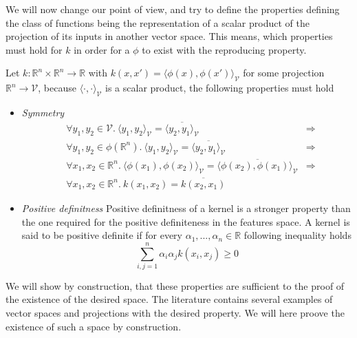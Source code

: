 We will now change our point of view, and try to define the properties defining the class of functions being the representation of a scalar product of the projection of its inputs in another vector space. This means, which properties must hold for $k$ in order for a $\phi$ to exist with the reproducing property.

Let $k :\mathbb{R}^n \times \mathbb{R}^n \rightarrow \mathbb{R}$ with $k(x, x') = \langle \phi(x), \phi(x')\rangle _{\mathcal{V}}$ for some projection $\mathbb{R}^n \rightarrow \mathcal{V}$, because $\langle \cdot, \cdot\rangle _{\mathcal{V}}$ is a scalar product, the following properties must hold

\begin{itemize}
\item \textit{Symmetry}
  \begin{equation*}
    \begin{aligned}
      & \forall y_1, y_2 \in \mathcal{V}.\ 
      \langle y_1, y_2\rangle _{\mathcal{V}} = \overline{\langle y_2, y_1\rangle _{\mathcal{V}}} & \Rightarrow\\
      & \forall y_1, y_2 \in \phi(\mathbb{R}^n).\ 
      \langle y_1, y_2\rangle _{\mathcal{V}} = \overline{\langle y_2, y_1\rangle _{\mathcal{V}}} & \Rightarrow\\
      &\forall x_1, x_2 \in \mathbb{R}^n.\ 
      \langle \phi(x_1), \phi(x_2)\rangle _{\mathcal{V}} = \overline{\langle \phi(x_2), \phi(x_1)\rangle _{\mathcal{V}}} &\Rightarrow\\
      &\forall x_1, x_2 \in \mathbb{R}^n.\ 
         k\left(x_1, x_2\right) = \overline{k\left(x_2, x_1\right)}
    \end{aligned}
  \end{equation*}

\item \textit{Positive definitness} Positive definitness of a kernel is a stronger property than the one required for the positive definiteness in the features space. A kernel is said to be positive definite if for every $\alpha_1, ..., \alpha_n \in \mathbb{R}$ following inequality holds
  \begin{equation*}
    \sum_{i,j=1}^n\alpha_i\alpha_jk\left(x_i, x_j\right) \geq 0
  \end{equation*}
\end{itemize}

We will show by construction, that these properties are sufficient to the proof of the existence of the desired space. The literature contains several examples of vector spaces and projections with the desired property. We will here proove the existence of such a space by construction.

